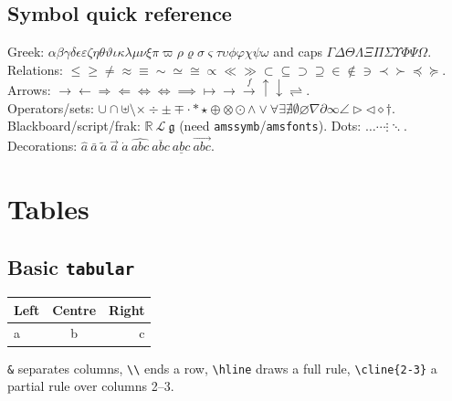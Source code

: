 \documentclass[11pt]{article}
\theoremstyle{plain}
\theoremstyle{definition}
\theoremstyle{remark}
\begin{document}
\subsection{Symbol quick reference}
Greek: $\alpha\beta\gamma\delta\epsilon\varepsilon\zeta\eta\theta
\vartheta\iota\kappa\lambda\mu\nu\xi\pi\varpi\rho\varrho\sigma\varsigma
\tau\upsilon\phi\varphi\chi\psi\omega$ and caps
$\Gamma\Delta\Theta\Lambda\Xi\Pi\Sigma\Upsilon\Phi\Psi\Omega$.\\
Relations: $\le\ge\ne\approx\equiv\sim\simeq\cong\propto\ll\gg
\subset\subseteq\supset\supseteq\in\notin\ni\prec\succ\preceq\succeq$.\\
Arrows: $\to\gets\Rightarrow\Leftarrow\Leftrightarrow\iff\implies
\mapsto\longrightarrow\xrightarrow{f}\uparrow\downarrow\rightleftharpoons$.\\
Operators/sets: $\cup\cap\uplus\setminus\times\div\pm\mp\cdot\ast\star
\oplus\otimes\odot\wedge\vee\forall\exists\nexists\emptyset\varnothing
\nabla\partial\infty\angle\triangleright\triangleleft\diamond\dagger$.\\
Blackboard/script/frak: $\mathbb{R}\ \mathcal{L}\ \mathfrak{g}$
(need \texttt{amssymb}/\texttt{amsfonts}). Dots: $\dots\cdots\vdots\ddots$.
Decorations: $\hat{a}\ \bar{a}\ \tilde{a}\ \vec{a}\ \dot{a}\ \widehat{abc}
\ \overline{abc}\ \underline{abc}\ \overrightarrow{abc}$.

\section{Tables}
\subsection{Basic \texttt{tabular}}
\begin{center}
\begin{tabular}{|l|c|r|}     %
  \hline
  Left & Centre & Right \\ \hline
  a & b & c \\ \hline
\end{tabular}
\end{center}
\verb|&| separates columns, \verb|\\| ends a row, \verb|\hline| draws a
full rule, \verb|\cline{2-3}| a partial rule over columns 2--3.
\end{document}
